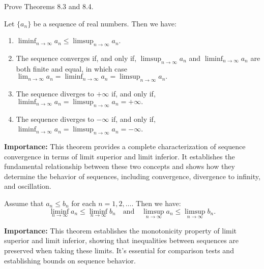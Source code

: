 \begin{problembox}
\begin{problemstatement}
Prove Theorems 8.3 and 8.4.

\begin{theorem}[Theorem 8.3]
Let \(\{a_n\}\) be a sequence of real numbers. Then we have:
\begin{enumerate}[label=\alph*)]
\item \(\liminf_{n \to \infty} a_n \leq \limsup_{n \to \infty} a_n.\)
\item The sequence converges if, and only if, \(\limsup_{n \to \infty} a_n\) and \(\liminf_{n \to \infty} a_n\) are both finite and equal, in which case \(\lim_{n \to \infty} a_n = \liminf_{n \to \infty} a_n = \limsup_{n \to \infty} a_n.\)
\item The sequence diverges to \(+\infty\) if, and only if, \(\liminf_{n \to \infty} a_n = \limsup_{n \to \infty} a_n = +\infty.\)
\item The sequence diverges to \(-\infty\) if, and only if, \(\liminf_{n \to \infty} a_n = \limsup_{n \to \infty} a_n = -\infty\).
\end{enumerate}
\end{theorem}

\noindent\textbf{Importance:} This theorem provides a complete characterization of sequence convergence in terms of limit superior and limit inferior. It establishes the fundamental relationship between these two concepts and shows how they determine the behavior of sequences, including convergence, divergence to infinity, and oscillation.



\begin{theorem}[Theorem 8.4]
Assume that \(a_n \leq b_n\) for each \(n = 1, 2, \ldots\). Then we have:
\[
\liminf_{n \to \infty} a_n \leq \liminf_{n \to \infty} b_n \quad \text{and} \quad \limsup_{n \to \infty} a_n \leq \limsup_{n \to \infty} b_n.
\]
\end{theorem}

\noindent\textbf{Importance:} This theorem establishes the monotonicity property of limit superior and limit inferior, showing that inequalities between sequences are preserved when taking these limits. It's essential for comparison tests and establishing bounds on sequence behavior.


\end{problemstatement}
\end{problembox}


